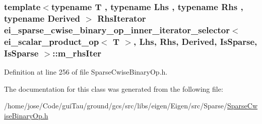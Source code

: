 \hypertarget{classei__sparse__cwise__binary__op__inner__iterator__selector_3_01ei__scalar__product__op_3_01_t3642a5ce0210f5e8cb62d8f3cd863802_a4842a03af5badb257e9e6f1aaf161610}{
\subsubsection[{m\-\_\-rhs\-Iter}]{\setlength{\rightskip}{0pt plus 5cm}template$<$typename T , typename Lhs , typename Rhs , typename Derived $>$ Rhs\-Iterator {\bf ei\-\_\-sparse\-\_\-cwise\-\_\-binary\-\_\-op\-\_\-inner\-\_\-iterator\-\_\-selector}$<$ {\bf ei\-\_\-scalar\-\_\-product\-\_\-op}$<$ T $>$, Lhs, Rhs, Derived, {\bf Is\-Sparse}, {\bf Is\-Sparse} $>$\-::m\-\_\-rhs\-Iter\hspace{0.3cm}{\ttfamily [protected]}}}\label{classei__sparse__cwise__binary__op__inner__iterator__selector_3_01ei__scalar__product__op_3_01_t3642a5ce0210f5e8cb62d8f3cd863802_a4842a03af5badb257e9e6f1aaf161610}


Definition at line 256 of file Sparse\-Cwise\-Binary\-Op.\-h.



The documentation for this class was generated from the following file\-:\begin{DoxyCompactItemize}
\item 
/home/jose/\-Code/gui\-Tau/ground/gcs/src/libs/eigen/\-Eigen/src/\-Sparse/\hyperlink{_sparse_cwise_binary_op_8h}{Sparse\-Cwise\-Binary\-Op.\-h}\end{DoxyCompactItemize}
